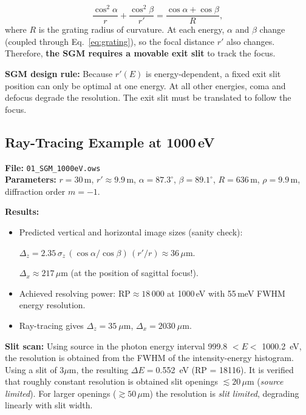 \documentclass[12pt,a4paper]{article}
\newcommand{\placeholder}[4][\linewidth]{%
  \begin{figure}[H]
    \centering
    \begin{tikzpicture}
      \draw[fill=plbg, draw=plframe, line width=1pt, dashed]
            (0,0) rectangle (#1, #2);
      \draw[plframe, line width=0.4pt] (0,0) -- (#1,#2);
      \draw[plframe, line width=0.4pt] (#1,0) -- (0,#2);
      \node[anchor=north west, font=\small\bfseries\color{plframe},
            inner sep=4pt] at (0,#2) {#3};
      \node[anchor=center, font=\small\itshape\color{pltext},
            text width=0.75\linewidth, align=center]
            at ({0.5*#1},{0.5*#2}) {#4};
    \end{tikzpicture}
  \end{figure}
}
\newcommand{\al}{\alpha}
\newcommand{\be}{\beta}
\newcommand{\RP}{\mathrm{RP}}
\begin{document}
\begin{equation}
  \frac{\cos^2\al}{r} + \frac{\cos^2\be}{r'} = \frac{\cos\al + \cos\be}{R},
  \label{eq:SGM_focus}
\end{equation}
where $R$ is the grating radius of curvature.  At each energy, $\al$ and $\be$ change
(coupled through Eq.~\eqref{eq:grating}), so the focal distance $r'$ also changes.
Therefore, \textbf{the SGM requires a movable exit slit} to track the focus.


\begin{notebox}
\textbf{SGM design rule:} Because $r'(E)$ is energy-dependent, a fixed exit slit position
can only be optimal at one energy.  At all other energies, coma and defocus degrade the
resolution.  The exit slit must be translated to follow the focus.
\end{notebox}

\subsection{Ray-Tracing Example at 1000\,eV}

\begin{exbox}
\textbf{File:} \texttt{01\_SGM\_1000eV.ows}\\[4pt]
\textbf{Parameters:} $r = 30$\,m, $r' \approx 9.9$\,m, $\al = 87.3^\circ$, $\be = 89.1^\circ$, $R =636$\,m, $\rho =9.9$\,m,
diffraction order $m = -1$.

\medskip
\textbf{Results:}
\begin{itemize}
  \item Predicted vertical and horizontal image sizes (sanity check):

  
  $\Delta_z = 2.35\,\sigma_z\,(\cos\al/\cos\be)\,(r'/r) \approx 36\,\mu$m.
  
  $\Delta_x \approx 217\,\mu$m (at the position of sagittal focus!).
  \item Achieved resolving power: $\RP \approx 18\,000$ at 1000\,eV with 55\,meV FWHM
        energy resolution.
  \item Ray-tracing gives $\Delta_z = 35~\mu$m, $\Delta_x = 2030~\mu$m.
\end{itemize}

\medskip
\textbf{Slit scan:} Using source in the photon energy interval 999.8 $< E < $ 1000.2~eV, the resolution is obtained from the FWHM of the intensity-energy histogram. Using a slit of 3$\mu$m, the resulting $\Delta E=$0.552~eV (RP = 18116).  It is verified that roughly constant resolution is obtained slit openings
$\lesssim 20\,\mu$m (\emph{source limited}).
For larger openings ($\gtrsim 50\,\mu$m) the resolution is
\emph{slit limited}, degrading linearly with slit width.
\end{exbox}
\end{document}
